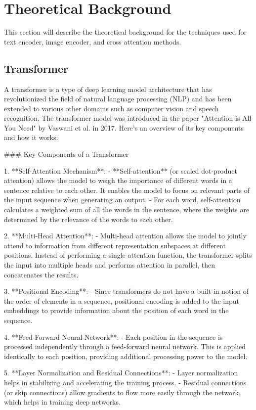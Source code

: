\chapter{Theoretical Background}
This section will describe the theoretical background for the techniques used for text encoder, image encoder, and cross attention methods. 
\section{Transformer}
A transformer is a type of deep learning model architecture that has revolutionized the field of natural language processing (NLP) and has been extended to various other domains such as computer vision and speech recognition. The transformer model was introduced in the paper "Attention is All You Need" by Vaswani et al. in 2017. Here's an overview of its key components and how it works:

### Key Components of a Transformer

1. **Self-Attention Mechanism**:
   - **Self-attention** (or scaled dot-product attention) allows the model to weigh the importance of different words in a sentence relative to each other. It enables the model to focus on relevant parts of the input sequence when generating an output.
   - For each word, self-attention calculates a weighted sum of all the words in the sentence, where the weights are determined by the relevance of the words to each other.

2. **Multi-Head Attention**:
   - Multi-head attention allows the model to jointly attend to information from different representation subspaces at different positions. Instead of performing a single attention function, the transformer splits the input into multiple heads and performs attention in parallel, then concatenates the results.

3. **Positional Encoding**:
   - Since transformers do not have a built-in notion of the order of elements in a sequence, positional encoding is added to the input embeddings to provide information about the position of each word in the sequence.

4. **Feed-Forward Neural Network**:
   - Each position in the sequence is processed independently through a feed-forward neural network. This is applied identically to each position, providing additional processing power to the model.

5. **Layer Normalization and Residual Connections**:
   - Layer normalization helps in stabilizing and accelerating the training process.
   - Residual connections (or skip connections) allow gradients to flow more easily through the network, which helps in training deep networks.

